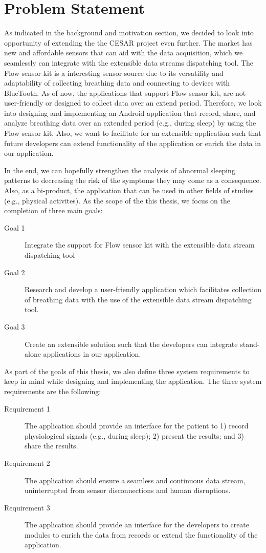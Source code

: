 \section{Problem Statement}

As indicated in the background and motivation section, we decided to look into opportunity of extending the the CESAR project even further. The market has new and affordable sensors that can aid with the data acquisition, which we seamlessly can integrate with the extensible data streams dispatching tool. The Flow sensor kit is a interesting sensor source due to its versatility and adaptability of collecting breathing data and connecting to devices with BlueTooth. As of now, the applications that support Flow sensor kit, are not user-friendly or designed to collect data over an extend period. Therefore, we look into designing and implementing an Android application that record, share, and analyze breathing data over an extended period (e.g., during sleep) by using the Flow sensor kit. Also, we want to facilitate for an extensible application such that future developers can extend functionality of the application or enrich the data in our application. 

In the end, we can hopefully strengthen the analysis of abnormal sleeping patterns to decreasing the risk of the symptoms they may come as a consequence. Also, as a bi-product, the application that can be used in other fields of studies (e.g., physical activites). As the scope of the this thesis, we focus on the completion of three main goals:

\begin{description}
    \item[Goal 1] Integrate the support for Flow sensor kit with the extensible data stream dispatching tool
    \item[Goal 2] Research and develop a user-friendly application which facilitates collection of breathing data with the use of the extensible data stream dispatching tool.
    \item[Goal 3] Create an extensible solution such that the developers can integrate stand-alone applications in our application. 
\end{description}

As part of the goals of this thesis, we also define three system requirements to keep in mind while designing and implementing the application. The three system requirements are the following: 

\begin{description}
    \item[Requirement 1] The application should provide an interface for the patient to 1) record physiological signals (e.g., during sleep); 2) present the results; and 3) share the results.
    \item[Requirement 2] The application should ensure a seamless and continuous data stream, uninterrupted from sensor disconnections and human disruptions.
    \item[Requirement 3] The application should provide an interface for the developers to create modules to enrich the data from records or extend the functionality of the application.
\end{description}

